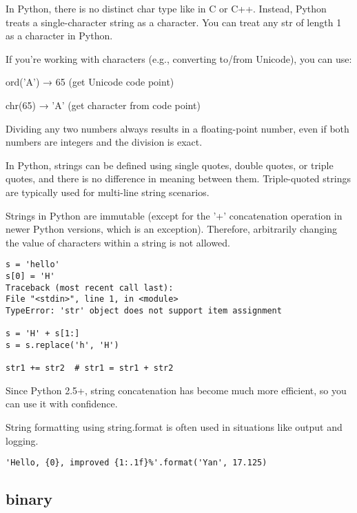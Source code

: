 \documentclass[a4paper,12pt,twoside]{book}
\begin{document}
In Python, there is no distinct char type like in C or C++. Instead, Python treats a single-character string as a character.
You can treat any str of length 1 as a character in Python.

If you're working with characters (e.g., converting to/from Unicode), you can use:

ord('A') → 65 (get Unicode code point)

chr(65) → 'A' (get character from code point)


Dividing any two numbers always results in a floating-point number, even if both numbers are integers and the division is exact.


In Python, strings can be defined using single quotes, double quotes, or triple quotes, and there is no difference in meaning between them. Triple-quoted strings are typically used for multi-line string scenarios. 

Strings in Python are immutable (except for the '+' concatenation operation in newer Python versions, which is an exception). Therefore, arbitrarily changing the value of characters within a string is not allowed. 
\begin{lstlisting}
s = 'hello'
s[0] = 'H'
Traceback (most recent call last):
File "<stdin>", line 1, in <module>
TypeError: 'str' object does not support item assignment

s = 'H' + s[1:]
s = s.replace('h', 'H')

str1 += str2  # str1 = str1 + str2
\end{lstlisting}

Since Python 2.5+, string concatenation has become much more efficient, so you can use it with confidence. 

String formatting using string.format is often used in situations like output and logging.


\begin{lstlisting}
'Hello, {0}, improved {1:.1f}%'.format('Yan', 17.125)
\end{lstlisting}

\subsection{binary}
\end{document}

